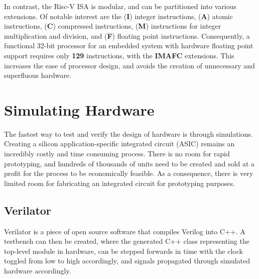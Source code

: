 \documentclass[a4paper,8pt]{report}
\begin{document}
In contrast, the Risc-V ISA is modular, and can be partitioned into various
extensions. Of notable interest are the (\textbf{I}) integer instructions,
(\textbf{A}) atomic instructions, (\textbf{C}) compressed instructions,
(\textbf{M}) instructions for integer multiplication and division, and
(\textbf{F}) floating point instructions. Consequently, a functional 32-bit
processor for an embedded system with hardware floating point support requires
only \textbf{129} instructions, with the \textbf{IMAFC} extensions. This
increases the ease of processor design, and avoids the creation of unnecessary
and superfluous hardware.

\section{Simulating Hardware} 
The fastest way to test and verify the design of hardware is through simulations.
Creating a silicon application-specific integrated circuit (ASIC) remains an
incredibly costly and time consuming process. There is no room for rapid
prototyping, and hundreds of thousands of units need to be created and sold at a
profit for the process to be economically feasible. As a consequence, there is
very limited room for fabricating an integrated circuit for prototyping purposes.

\subsection{Verilator}
Verilator\cite{dg-verilator} is a piece of open source software that compiles Verilog into C++. A
testbench can then be created, where the generated C++ class representing the
top-level module in hardware, can be stepped forwards in time with the clock
toggled from low to high accordingly, and signals propagated through simulated
hardware accordingly.
\end{document}
